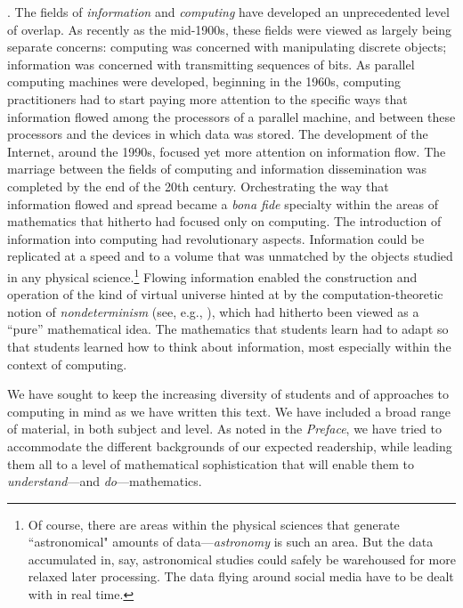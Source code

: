 .
The fields of {\it information}  and {\em computing} have developed an unprecedented level of overlap.  As recently as the mid-1900s, these fields were viewed as largely being separate concerns: computing was concerned with manipulating discrete
objects; information was concerned with transmitting sequences of bits.  As parallel computing machines were developed, beginning in the 1960s, computing practitioners had to start paying more attention to the specific ways that information flowed among the processors of a parallel machine, and between these processors and the devices in which data was stored.  The development of the Internet, around the 1990s, focused yet more attention on information flow.  The marriage between the fields of computing and information dissemination was completed by the end of the 20th century.  Orchestrating the way that information flowed and spread became a {\it bona fide} specialty within the areas of mathematics that hitherto had focused only on
computing.  The introduction of information into computing had revolutionary aspects.  Information could be replicated at a speed and to a volume that was unmatched by the objects studied in any physical science.\footnote{Of course, there are areas within the  physical sciences that generate ``astronomical" amounts of data---{\it astronomy} is such an area.  But the data accumulated in, say, astronomical studies could safely be warehoused for more relaxed later processing.  The data flying around social media have to be dealt with in real time.}  Flowing information enabled the construction and operation of the kind of virtual universe hinted at by the computation-theoretic notion of {\it nondeterminism}  (see, e.g., \cite{Rosenberg09}), which had hitherto been viewed as a ``pure'' mathematical idea.  The mathematics that students learn had to adapt so that students learned how to think about information, most especially within the context of computing.

\bigskip

We have sought to keep the increasing diversity of students and of approaches to computing in mind as we have written this text.  We have included a broad range of material, in both subject and level.  As noted in the {\it Preface}, we have tried to accommodate the different backgrounds of our expected readership, while leading them all to a level of mathematical sophistication that will enable them to {\em understand}---and {\em do}---mathematics.

